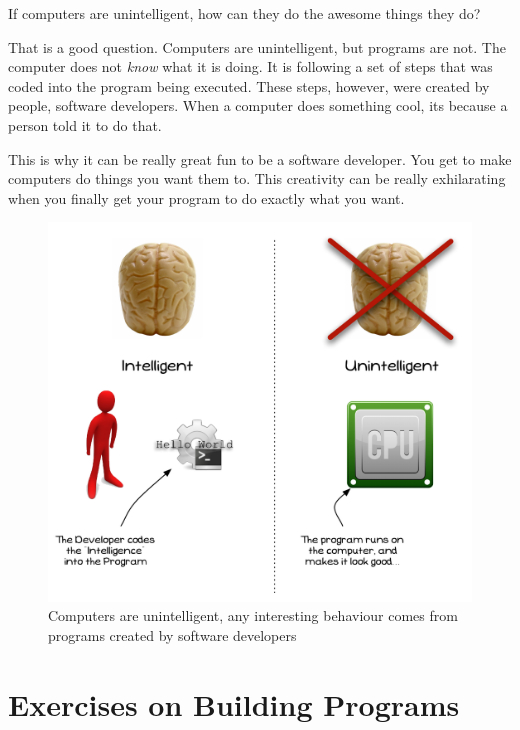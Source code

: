 If computers are unintelligent, how can they do the awesome things they do?

That is a good question. Computers are unintelligent, but programs are not. The computer does not \emph{know} what it is doing. It is following a set of steps that was coded into the program being executed. These steps, however, were created by people, software developers. When a computer does something cool, its because a person told it to do that.

This is why it can be really great fun to be a software developer. You get to make computers do things you want them to. This creativity can be really exhilarating when you finally get your program to do exactly what you want.

\begin{figure}[h]
   \centering
   \includegraphics[width=\textwidth]{./topics/programs-and-compilers/diagrams/ProgramIntelligence} 
   \caption{Computers are unintelligent, any interesting behaviour comes from programs created by software developers}
   \label{fig:program-intelligence}
\end{figure}


\clearpage
\section{Exercises on Building Programs} %
\label{sec:examples_and_exercises_on_building_programs}

